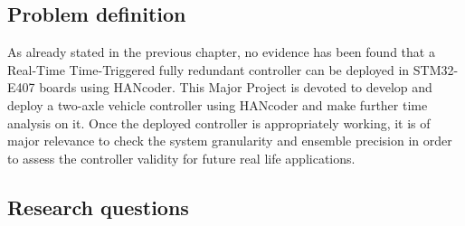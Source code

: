 \documentclass[table,xcdraw]{article}
\begin{document}
\subsection{Problem definition}\label{sec:problem_definition}

As already stated in the previous chapter, no evidence has been found that a Real-Time Time-Triggered fully redundant controller can be deployed in STM32-E407 boards using HANcoder. This Major Project is devoted to develop and deploy a two-axle vehicle controller using HANcoder and make further time analysis on it. Once the deployed controller is appropriately working, it is of major relevance to check the system granularity and ensemble precision in order to assess the controller validity for future real life applications.\\





\subsection{Research questions}

\end{document}
